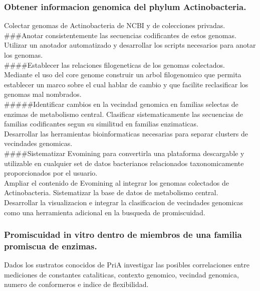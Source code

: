 \documentclass[12pt,twoside]{reedthesis}
\begin{document}
  \subsubsection{Obtener informacion genomica del phylum
  Actinobacteria.}\label{obtener-informacion-genomica-del-phylum-actinobacteria.}
  
  Colectar genomas de Actinobacteria de NCBI y de colecciones privadas.\\
  \#\#\#Anotar consistentemente las secuencias codificantes de estos
  genomas.\\
  Utilizar un anotador automatizado y desarrollar los scripts necesarios
  para anotar los genomas.\\
  \#\#\#\#Establecer las relaciones filogeneticas de los genomas
  colectados.\\
  Mediante el uso del core genome construir un arbol filogenomico que
  permita establecer un marco sobre el cual hablar de cambio y que
  facilite reclasificar los genomas mal nombrados.\\
  \#\#\#\#\#Identificar cambios en la vecindad genomica en familias
  selectas de enzimas de metabolismo central. Clasificar sistematicamente
  las secuencias de familias codificantes segun su similitud en familias
  enzimaticas.\\
  Desarrollar las herramientas bioinformaticas necesarias para separar
  clusters de vecindades genomicas.\\
  \#\#\#\#Sistematizar Evomining para convertirla una plataforma
  descargable y utilizable en cualquier set de datos bacterianos
  relacionados taxonomicamente proporcionados por el usuario.\\
  Ampliar el contenido de Evomining al integrar los genomas colectados de
  Actinobacteria. Sistematizar la base de datos de metabolismo central.\\
  Desarrollar la visualizacion e integrar la clasificacion de vecindades
  genomicas como una herramienta adicional en la busqueda de promiscuidad.
  
  \subsubsection{Promiscuidad in vitro dentro de miembros de una familia
  promiscua de
  enzimas.}\label{promiscuidad-in-vitro-dentro-de-miembros-de-una-familia-promiscua-de-enzimas.}
  
  Dados los sustratos conocidos de PriA investigar las posibles
  correlaciones entre mediciones de constantes cataliticas, contexto
  genomico, vecindad genomica, numero de conformeros e indice de
  flexibilidad.
  
\end{document}
